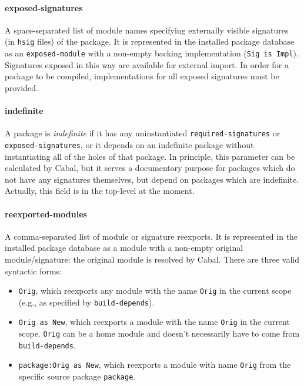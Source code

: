 \documentclass{article}
\newcommand{\Red}[1]{{\color{red} #1}}
\begin{document}
\paragraph{exposed-signatures}  A space-separated list of module names
specifying externally visible signatures (in \texttt{hsig} files) of the package.  It is
represented in the installed package database as an \texttt{exposed-module} with a
non-empty backing implementation (\texttt{Sig is Impl}). Signatures exposed in this way are
available for external import.  In order for a package to be compiled,
implementations for all exposed signatures must be provided.

\paragraph{indefinite}  A package is \emph{indefinite} if it has any
uninstantiated
\texttt{required-signatures} or \texttt{exposed-signatures}, or it
depends on an indefinite package without instantiating all of the holes
of that package.  In principle, this parameter can be calculated
by Cabal, but it serves a documentory purpose for packages which do not
have any signatures themselves, but depend on packages which are indefinite.
\Red{Actually, this field is in the top-level at the moment.}

\paragraph{reexported-modules}  A comma-separated list of module or
signature reexports.  It is represented in the installed package
database as a module with a non-empty original module/signature: the
original module is resolved by Cabal.  There are three valid syntactic
forms:

\begin{itemize}
    \item \texttt{Orig}, which reexports any module with the
    name \texttt{Orig} in the current scope (e.g.,
    as specified by \texttt{build-depends}).

    \item \texttt{Orig as New}, which reexports a module with
    the name \texttt{Orig} in the current scope.  \texttt{Orig}
    can be a home module and doesn't necessarily have to come
    from \texttt{build-depends}.

    \item \texttt{package:Orig as New}, which reexports a module
    with name \texttt{Orig} from the specific source package \texttt{package}.
\end{itemize}
\end{document}
